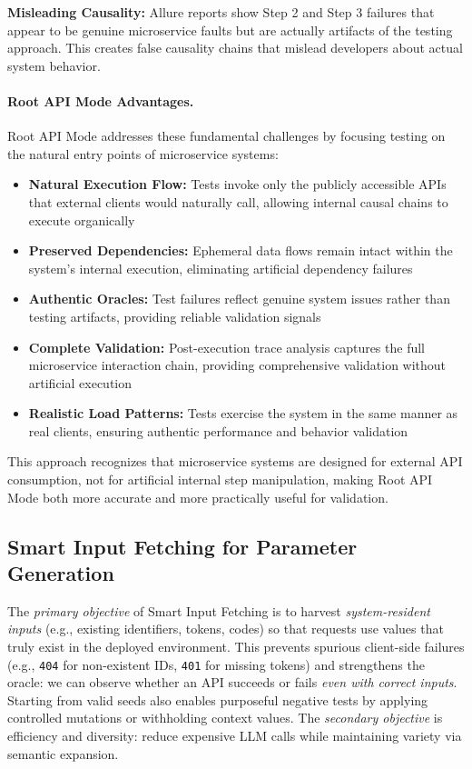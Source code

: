 \documentclass[conference]{IEEEtran}
\begin{document}
\textbf{Misleading Causality:} Allure reports show Step 2 and Step 3 failures that appear to be genuine microservice faults but are actually artifacts of the testing approach. This creates false causality chains that mislead developers about actual system behavior.

\paragraph{Root API Mode Advantages.}
Root API Mode addresses these fundamental challenges by focusing testing on the natural entry points of microservice systems:

\begin{itemize}[leftmargin=*]
\item \textbf{Natural Execution Flow:} Tests invoke only the publicly accessible APIs that external clients would naturally call, allowing internal causal chains to execute organically
\item \textbf{Preserved Dependencies:} Ephemeral data flows remain intact within the system's internal execution, eliminating artificial dependency failures
\item \textbf{Authentic Oracles:} Test failures reflect genuine system issues rather than testing artifacts, providing reliable validation signals
\item \textbf{Complete Validation:} Post-execution trace analysis captures the full microservice interaction chain, providing comprehensive validation without artificial execution
\item \textbf{Realistic Load Patterns:} Tests exercise the system in the same manner as real clients, ensuring authentic performance and behavior validation
\end{itemize}

This approach recognizes that microservice systems are designed for external API consumption, not for artificial internal step manipulation, making Root API Mode both more accurate and more practically useful for validation.

\subsection{Smart Input Fetching for Parameter Generation}\label{ssec:smartfetch}

The \emph{primary objective} of Smart Input Fetching is to harvest \emph{system-resident inputs} (e.g., existing identifiers, tokens, codes) so that requests use values that truly exist in the deployed environment. This prevents spurious client-side failures (e.g., \texttt{404} for non-existent IDs, \texttt{401} for missing tokens) and strengthens the oracle: we can observe whether an API succeeds or fails \emph{even with correct inputs}. Starting from valid seeds also enables purposeful negative tests by applying controlled mutations or withholding context values. The \emph{secondary objective} is efficiency and diversity: reduce expensive LLM calls while maintaining variety via semantic expansion.
\end{document}
